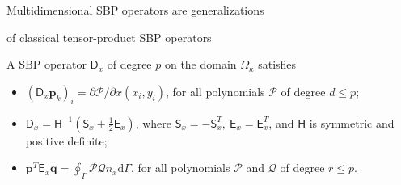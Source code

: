 \documentclass[final]{beamer}
\newlength{\firstcolwid}
\newcommand{\fnc}[1]{\ensuremath{\mathcal{#1}}}
\newcommand{\mat}[1]{\ensuremath{\mathsf{#1}}}
\newcommand{\mr}[1]{\mathrm{#1}}
\renewcommand{\H}[0]{\mat{H}}
\newcommand{\D}[0]{\mat{D}}
\newcommand{\Dx}[0]{\mat{D}_{x}}
\newcommand{\Skew}[0]{\mat{S}}
\newcommand{\Sx}[0]{\Skew_{x}}
\newcommand{\Ex}[0]{\mat{E}_{x}}
\newcommand{\pk}{\bm{p}_{k}}
\newcommand{\poly}[1]{\mathbb{P}_{#1}}
\begin{document}
\begin{frame}[t]
\begin{columns}[t]
\begin{column}{\firstcolwid}

%
%
\setlength{\parindent}{1em}
\begin{alertblock}{Multidimensional SBP operators are generalizations 
        
        of classical tensor-product SBP operators~\cite{multiSBP}}
    A SBP operator $\D_x$ of degree $p$ on the domain $\Omega_\kappa$ satisfies 
    \small
    \begin{itemize}
        \setlength{\itemindent}{1em}
        \item $(\Dx\pk)_i = \partial \fnc{P}/\partial x(x_i,y_i)$, for all polynomials $\mathcal{P}$ of degree $d \leq p$; 
        \item $\Dx = \H^{-1}(\Sx+\frac{1}{2}\Ex)$, where $\Sx=-\Sx^T,\: \Ex=\Ex^T$, and $\H$ is symmetric and positive definite;
        \item $\bm{p}^T\Ex\bm{q} =\displaystyle\oint _{\Gamma} \fnc{P} \fnc{Q} n_{x}
        \mr{d}\Gamma$, for all polynomials $\mathcal{P}$ and $\mathcal{Q}$ of degree $r \leq p$. 
    \end{itemize}
    \normalfont
\end{alertblock}


\end{column}
\end{columns}
\end{frame}
\end{document}
